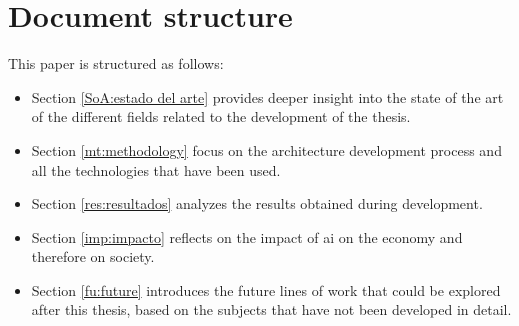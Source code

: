 \section{Document structure}

This paper is structured as follows:

\begin{itemize}
    \item Section \ref{SoA:estado del arte} provides deeper insight into the state of the art of the different fields related to the development of the thesis.
    \item Section \ref{mt:methodology} focus on the architecture development process and all the technologies that have been used.
    \item Section \ref{res:resultados} analyzes the results obtained during development.
    \item Section \ref{imp:impacto} reflects on the impact of \gls{ai} on the economy and therefore on society.
    \item Section \ref{fu:future} introduces the future lines of work that could be explored after this thesis, based on the subjects that have not been developed in detail.
\end{itemize}